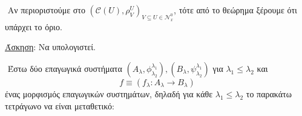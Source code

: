 $ $\newline
Αν περιοριστούμε στο $(\mathcal{C}(U),\rho^U_V)_{V\subseteq U \in \mathcal{N}^0_x}$, τότε από το θεώρημα ξέρουμε ότι υπάρχει το όριο. 

\underline{Άσκηση}: Να υπολογιστεί.

$ $\newline
Έστω δύο επαγωγικά συστήματα $(A_{\lambda},\phi^{\lambda_1}_{\lambda_2}), (B_{\lambda},\psi^{\lambda_1}_{\lambda_2})$ για $\lambda_1\leq \lambda_2$ και
$$f\equiv (f_{\lambda}:A_{\lambda}\rightarrow B_{\lambda})$$ ένας μορφισμός επαγωγικών συστημάτων, δηλαδή για κάθε $\lambda_1 \leq \lambda_2$
το παρακάτω τετράγωνο να είναι μεταθετικό:

\begin{figure}[H]
    \centering
\end{figure}

